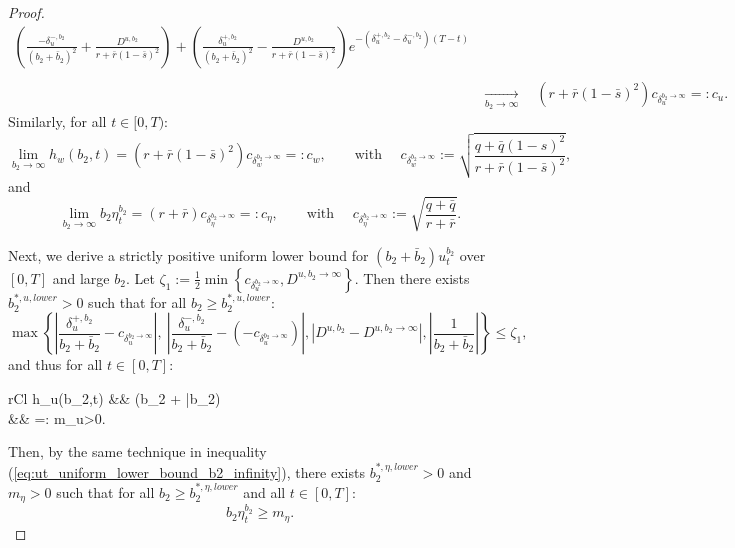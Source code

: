 \documentclass[11pt]{article}
\begin{document}
\begin{proof}
\begin{equation*}
\begin{split}
		{\displaystyle \left(\frac{- \delta^{-,b_2}_u}{(b_2 + \bar{b}_2)^2} + \frac{D^{u,b_2}}{r + \bar{r}(1-\bar{s})^2} \right) + \left(\frac{\delta^{+,b_2}_u}{(b_2 + \bar{b}_2)^2} - \frac{D^{u,b_2} }{r + \bar{r}(1-\bar{s})^2} \right)e^{- (\delta^{+,b_2}_u - \delta^{-,b_2}_u)(T-t)}  } \nonumber \\
		\\
		&\xrightarrow[b_2 \to \infty]{} \quad (r + \bar{r}(1-\bar{s})^2) c_{\delta_u^{b_2 \to \infty}}  =: c_u.
	\end{split}
	\end{equation*}
	Similarly, for all $t \in [0,T)$:
	$$\lim_{b_2 \to \infty} h_w(b_2,t)=  (r + \bar{r}(1-\bar{s})^2) c_{\delta_w^{b_2 \to \infty}} =: c_w,\qquad \text{with } \quad c_{\delta_w^{b_2 \to \infty}} := \sqrt{ \frac{q + \bar{q}(1-s)^2}{r + \bar{r}(1-\bar{s})^2} },$$
	and
	$$ \lim_{b_2 \to \infty}b_2 \eta_t^{b_2} = (r + \bar{r}) c_{\delta_{\eta}^{b_2 \to \infty}} =: c_\eta, \qquad \text{with } \quad c_{\delta_\eta^{b_2 \to \infty}} := \sqrt{ \frac{q + \bar{q}}{r +\bar{r}} }.$$
	
	Next, we derive a strictly positive uniform lower bound for $(b_2 + \bar{b}_2) u_t^{b_2}$ over $[0,T]$ and large $b_2$. Let $\zeta_1 :=\frac{1}{2} \min \left\{ c_{\delta_u^{b_2 \to \infty}}, D^{u,b_2 \to \infty} \right\}$. Then there exists $b_2^{*,u,lower}>0$ such that for all $b_2 \geq b_2^{*,u,lower}$:
	$$ 
	\max \left\{  \left\vert \frac{\delta_u^{+,b_2}}{b_2 + \bar{b}_2}  - c_{\delta_u^{b_2 \to \infty}} \right\vert, \   \left\vert \frac{\delta_u^{-,b_2}}{b_2 + \bar{b}_2}  - \left(-c_{\delta_u^{b_2 \to \infty}}\right) \right\vert, \left\vert D^{u,b_2} - D^{u,b_2\to \infty} \right\vert,  \left\vert \frac{1}{b_2 + \bar{b}_2} \right\vert  \right\} \leq \zeta_1,
	$$ 
	and thus for all $t \in [0,T]$:
	\begin{IEEEeqnarray}{rCl}
		h_u(b_2,t) &\geq&  (b_2 + \bar{b}_2)  \nonumber \\
		&\geq&  =: m_u>0.
	\label{eq:ut_uniform_lower_bound_b2_infinity}
	\end{IEEEeqnarray}
	Then, by the same technique in inequality (\ref{eq:ut_uniform_lower_bound_b2_infinity}), there exists $b_2^{*,\eta, lower} > 0$ and $m_\eta >0$ such that for all $b_2 \geq b_2^{*,\eta,lower}$ and all $t\in[0,T]$:
	\begin{equation}
	   b_2 \eta_t^{b_2} \geq m_\eta.
	\label{eq:eta_t_uniform_lower_bound_b2_infinity}
	\end{equation}


\end{proof}
\end{document}
